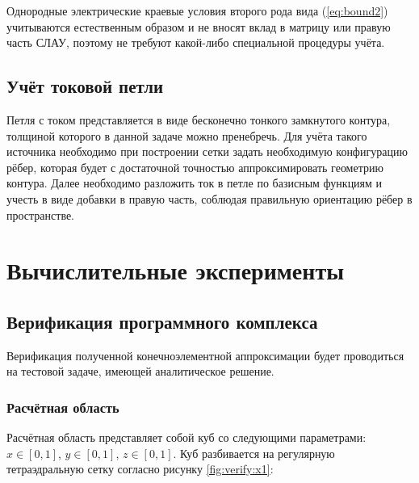 \documentclass[a4paper,14pt]{article}
\makeatletter
\newcommand{\labelname}[1]{%
	\def\@currentlabelname{#1}}%
\makeatother
\begin{document}
Однородные электрические краевые условия второго рода вида (\ref{eq:bound2}) учитываются естественным образом и не вносят вклад в матрицу или правую часть СЛАУ, поэтому не требуют какой-либо специальной процедуры учёта.


\subsection{Учёт токовой петли}
Петля с током представляется в виде бесконечно тонкого замкнутого контура, толщиной которого в данной задаче можно пренебречь. Для учёта такого источника необходимо при построении сетки задать необходимую конфигурацию рёбер, которая будет с достаточной точностью аппроксимировать геометрию контура. Далее необходимо разложить ток в петле по базисным функциям и учесть в виде добавки в правую часть, соблюдая правильную ориентацию рёбер в пространстве.


\clearpage
\section{Вычислительные эксперименты}
\labelname{3}\label{sec:numerical_experiments}
\subsection{Верификация программного комплекса}
Верификация полученной конечноэлементной аппроксимации будет проводиться на тестовой задаче, имеющей аналитическое решение.
\subsubsection{Расчётная область}
Расчётная область представляет собой куб со следующими параметрами: $x \in [0,1]$, $y \in [0,1]$, $z \in [0,1]$. Куб разбивается на регулярную тетраэдральную сетку согласно рисунку \ref{fig:verify:x1}:
\end{document}
